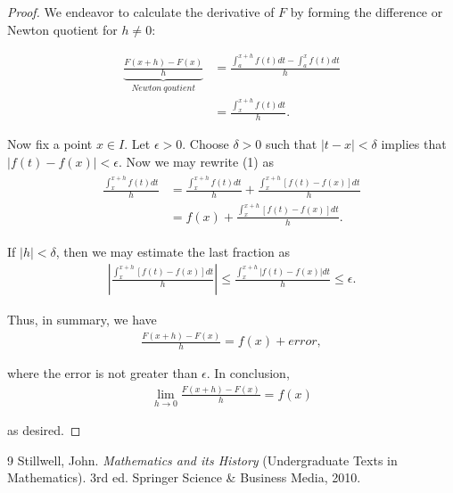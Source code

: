\documentclass{article}
\begin{document}
\begin{proof}
We endeavor to calculate the derivative of $F$ by forming the difference or Newton quotient for $h \neq 0$:

\begin{align*}
  \underbrace{\frac{F(x+h) - F(x)}{h}}_{Newton \ qoutient} &= \frac{\int^{x+h}_{a} f(t)dt - \int^x_a f(t)dt }{h} \\
   &= \frac{\int^{x+h}_{x} f(t)dt}{h}. \tag{1}
  \end{align*}

Now fix a point $x \in I.$ Let $\epsilon > 0.$ Choose $\delta > 0$ such that $|t - x| < \delta$ implies that 
$|f(t) - f(x)| < \epsilon.$ Now we may rewrite (1) as 
\begin{align*}
  \begin{split}
  \frac{\int^{x+h}_x f(t)dt}{h} &= \frac{\int^{x+h}_x f(t)dt}{h} + \frac{\int^{x+h}_x [f(t) - f(x)] dt }{h} \\
   &= f(x) + \frac{\int^{x+h}_x [f(t) - f(x)]dt}{h}.
  \end{split}
\end{align*}

If $|h| < \delta$, then we may estimate the last fraction as
\begin{align*}
    \left| \frac{\int^{x+h}_x [f(t) - f(x)]dt}{h} \right| \leq \frac{\int^{x+h}_x |f(t) - f(x)|dt}{h} \leq \epsilon.
\end{align*}

Thus, in summary, we have
\begin{align*}
    \frac{F(x+h) - F(x)}{h} = f(x) + error,
\end{align*}

where the error is not greater than $\epsilon$. In conclusion,
\begin{align*}
    \lim_{h \rightarrow 0}  \frac{F(x+h) - F(x)}{h} = f(x)
\end{align*}

as desired. 

\end{proof}


\begin{thebibliography}{9}
Stillwell, John.
\textit{Mathematics and its History} (Undergraduate Texts in Mathematics). 
 3rd ed. Springer Science \& Business Media, 2010.
\end{thebibliography}
\end{document}
